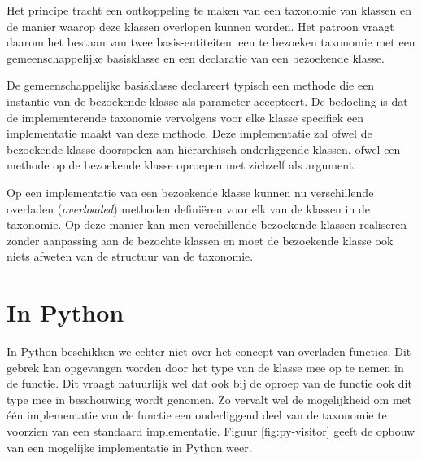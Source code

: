 Het principe tracht een ontkoppeling te maken van een taxonomie van klassen en
de manier waarop deze klassen overlopen kunnen worden. Het patroon vraagt
daarom het bestaan van twee basis-entiteiten: een te bezoeken taxonomie met een
gemeenschappelijke basisklasse en een declaratie van een bezoekende klasse.

De gemeenschappelijke basisklasse declareert typisch een methode 
die een instantie van de bezoekende klasse als parameter accepteert. De
bedoeling is dat de implementerende taxonomie vervolgens voor elke klasse
specifiek een implementatie maakt van deze methode. Deze implementatie zal
ofwel de bezoekende klasse doorspelen aan hi\"erarchisch onderliggende klassen,
ofwel een  methode op de bezoekende klasse oproepen met zichzelf als
argument.

Op een implementatie van een bezoekende klasse kunnen nu verschillende
overladen (\emph{overloaded}) methoden defini\"eren voor elk van de
klassen in de taxonomie. Op deze manier kan men verschillende bezoekende
klassen realiseren zonder aanpassing aan de bezochte klassen en moet de
bezoekende klasse ook niets afweten van de structuur van de taxonomie.

\section{In Python}

In Python beschikken we echter niet over het concept van overladen functies.
Dit gebrek kan opgevangen worden door het type van de klasse mee op te nemen in
de  functie. Dit vraagt natuurlijk wel dat ook bij de oproep van de
 functie ook dit type mee in beschouwing wordt genomen. Zo
vervalt wel de mogelijkheid om met \'e\'en implementatie van de functie een
onderliggend deel van de taxonomie te voorzien van een standaard implementatie.
Figuur \ref{fig:py-visitor} geeft de opbouw van een mogelijke implementatie in
Python weer.

